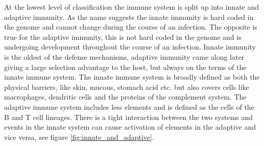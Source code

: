At the lowest level of classification the immune system is split up into innate and adaptive immunity.
As the name suggests the innate immunity is hard coded in the genome and cannot change during the course of an infection.
The opposite is true for the adaptive immunity, this is not hard coded in the genome and is undergoing development throughout the course of an infection.
Innate immunity is the oldest of the defense mechanisms, adaptive immunity came along later giving a large selection advantage to the host, but always on the terms of the innate immune system.
The innate immune system is broadly defined as both the physical barriers, like skin, mucous, stomach acid etc. but also covers cells like macrophages, dendritic cells and the proteins of the complement system.
The adaptive immune system includes less elements and is defined as the cells of the B and T cell lineages.
There is a tight interaction between the two systems and events in the innate system can cause activation of elements in the adaptive and vice versa, see figure \ref{fig:innate_and_adaptive}.

